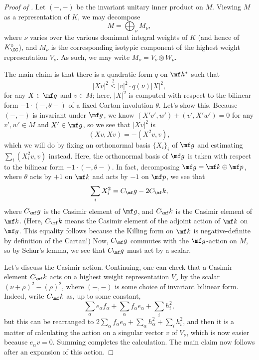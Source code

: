 \documentclass[../notes.tex]{subfiles}
\begin{document}
\begin{proof}[Proof of ]
	Let $(-,-)$ be the invariant unitary inner product on $M$. Viewing $M$ as a representation of $K$, we may decompose
	\[M=\bigoplus_\nu M_\nu,\]
	where $\nu$ varies over the various dominant integral weights of $K$ (and hence of $K_\CC^\circ$), and $M_\nu$ is the corresponding isotypic component of the highest weight representation $V_\nu$. As such, we may write $M_\nu=V_\nu\otimes W_\nu$.

	The main claim is that there is a quadratic form $q$ on $\mf h^*$ such that
	\[\left|Xv\right|^2\stackrel?\le\left|v\right|^2\cdot q(\nu)\left|X\right|^2,\]
	for any $X\in\mf g$ and $v\in M$; here, $\left|X\right|^2$ is computed with respect to the bilinear form $-1\cdot(-,\theta-)$ of a fixed Cartan involution $\theta$. Let's show this. Because $(-,-)$ is invariant under $\mf g$, we know $(X'v',w')+(v',X'w')=0$ for any $v',w'\in M$ and $X'\in\mf g$, so we see that $\left|Xv\right|^2$ is
	\[(Xv,Xv)=-\left(X^2v,v\right),\]
	which we will do by fixing an orthonormal basis $\{X_i\}_i$ of $\mf g$ and estimating $\sum_i\left(X_i^2v,v\right)$ instead. Here, the orthonormal basis of $\mf g$ is taken with respect to the bilinear form $-1\cdot(-,\theta-)$. In fact, decomposing $\mf g=\mf k\oplus\mf p$, where $\theta$ acts by $+1$ on $\mf k$ and acts by $-1$ on $\mf p$, we see that
	\[\sum_iX_i^2=C_\mf g-2C_\mf k,\]
	where $C_\mf g$ is the Casimir element of $\mf g$, and $C_\mf k$ is the Casimir element of $\mf k$. (Here, $C_\mf k$ means the Casimir element of the adjoint action of $\mf k$ on $\mf g$. This equality follows because the Killing form on $\mf k$ is negative-definite by definition of the Cartan!) Now, $C_\mf g$ commutes with the $\mf g$-action on $M$, so by Schur's lemma, we see that $C_\mf g$ must act by a scalar.
	
	Let's discuss the Casimir action. Continuing, one can check that a Casimir element $C_\mf k$ acts on a highest weight representation $V_\nu$ by the scalar $(\nu+\rho)^2-(\rho)^2$, where $(-,-)$ is some choice of invariant bilinear form. Indeed, write $C_\mf k$ as, up to some constant,
	\[\sum_\alpha e_\alpha f_\alpha+\sum_\alpha f_\alpha e_\alpha+\sum_ih_i^2,\]
	but this can be rearranged to $2\sum_\alpha f_\alpha e_\alpha+\sum_\alpha h_\alpha^2+\sum_ih_i^2$, and then it is a matter of calculating the action on a singular vector $v$ of $V_\nu$, which is now easier because $e_\alpha v=0$. Summing completes the calculation. The main claim now follows after an expansion of this action.


\end{proof}
\end{document}
